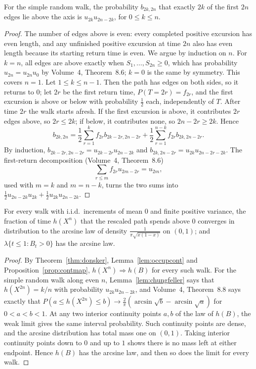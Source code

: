 \begin{lemma}\label{lem:chungfeller}
For the simple random walk, the probability $b_{2k,2n}$ that exactly $2k$ of the first $2n$ edges lie above the axis is $u_{2k}u_{2n-2k}$, for $0\le k\le n$.
\end{lemma}
\begin{proof}
The number of edges above is even: every completed positive excursion has even length, and any unfinished positive excursion at time $2n$ also has even length because its starting return time is even. We argue by induction on $n$. For
$k=n$, all edges are above exactly when $S_1,\dots,S_{2n}\ge0$, which has probability $u_{2n}=u_{2n}u_0$ by Volume~4, Theorem~8.6; $k=0$ is the same by symmetry. This
covers $n=1$. Let $1\le k\le n-1$. Then the path has edges on both sides, so it returns to $0$; let $2r$ be the first return time, $P(T=2r)=f_{2r}$, and the first excursion
is above or below with probability $\frac12$ each, independently of $T$. After time $2r$ the walk starts afresh. If the first excursion is above, it contributes $2r$ edges
above, so $2r\le2k$; if below, it contributes none, so $2n-2r\ge2k$. Hence
\[
b_{2k,2n}=\frac12\sum_{r=1}^kf_{2r}b_{2k-2r,2n-2r}+\frac12\sum_{r=1}^{n-k}f_{2r}b_{2k,2n-2r}.
\]
By induction, $b_{2k-2r,2n-2r}=u_{2k-2r}u_{2n-2k}$ and $b_{2k,2n-2r}=u_{2k}u_{2n-2r-2k}$. The first-return decomposition (Volume~4, Theorem~8.6)
\[
\textstyle\sum_{r\le m}f_{2r}u_{2m-2r}=u_{2m},
\]
used with $m=k$ and $m=n-k$, turns the two sums into $\frac12u_{2n-2k}u_{2k}+\frac12u_{2k}u_{2n-2k}$.
\end{proof}

\begin{theorem}\label{thm:arcsine}
For every walk with i.i.d.\ increments of mean $0$ and finite positive variance, the fraction of time $h(X^n)$ that the rescaled path spends above $0$ converges in distribution to the
arcsine law of density $\frac1{\pi\sqrt{x(1-x)}}$ on $(0,1)$; and $\lambda\{t\le1:B_t>0\}$ has the arcsine law.
\end{theorem}
\begin{proof}
By Theorem~\ref{thm:donsker}, Lemma~\ref{lem:occupcont} and Proposition~\ref{prop:contmap}, $h(X^n)\Rightarrow h(B)$ for every such walk. For the simple random walk along
even $n$, Lemma~\ref{lem:chungfeller} says that $h(X^{2n})=k/n$ with probability $u_{2k}u_{2n-2k}$, and Volume~4, Theorem~8.8 says exactly that
$P(a\le h(X^{2n})\le b)\to\frac2\pi(\arcsin\sqrt b-\arcsin\sqrt a)$ for $0<a<b<1$. At any two interior continuity points $a,b$ of the law of $h(B)$, the weak limit gives the same interval probability. Such continuity points are dense, and the arcsine distribution has total mass one on $(0,1)$. Taking interior continuity points down to $0$ and up to $1$ shows there is no mass left at either endpoint. Hence $h(B)$ has the arcsine law, and then so does the limit for every walk.
\end{proof}

